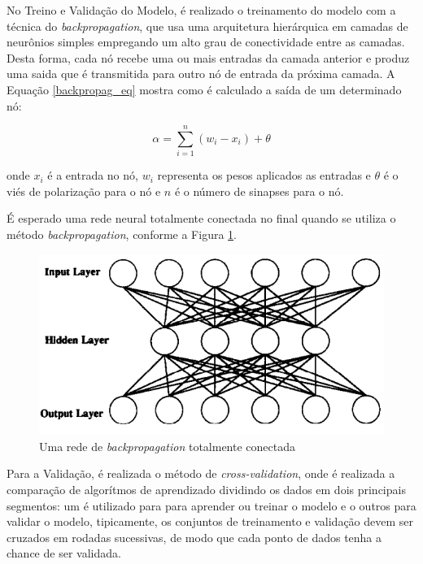 No Treino e Validação do Modelo, é realizado o treinamento do modelo com a técnica do \textit{backpropagation}, que usa uma arquitetura hierárquica em camadas de neurônios simples empregando um alto grau de conectividade entre as camadas.\cite{backpropagation} Desta forma, cada nó recebe uma ou mais entradas da camada anterior e produz uma saida que é transmitida para outro nó de entrada da próxima camada. A Equação \ref{backpropag_eq} mostra como é calculado a saída de um determinado nó:

\begin{equation}
\label{backpropag_eq}
    \alpha =  \sum_{i=1}^n  (w_i - x_i) + \theta
\end{equation}

onde {$x_i$} é a entrada no nó, {$w_i$} representa os pesos aplicados as entradas e {$\theta$} é o viés de polarização para o nó e {$n$} é o número de sinapses para o nó.

É esperado uma rede neural totalmente conectada no final quando se utiliza o método \textit{backpropagation}, conforme a Figura \ref{fig_backpropag}.

\begin{figure}[H]
	\centering
	\label{fig_backpropag}
		\includegraphics[keepaspectratio=true,scale=0.5]{figuras/backpropag.png}
	\caption{Uma rede de \textit{backpropagation} totalmente conectada \cite{backpropagation}}
\end{figure}

Para a Validação, é realizada o método de \textit{cross-validation}, onde é realizada a comparação de algorítmos de aprendizado dividindo os dados em dois principais segmentos: um é utilizado para para aprender ou treinar o modelo e o outros para validar o modelo, tipicamente, os conjuntos de treinamento e validação devem ser cruzados em rodadas sucessivas, de modo que cada ponto de dados tenha a chance de ser validada. \cite{cross_validation}

